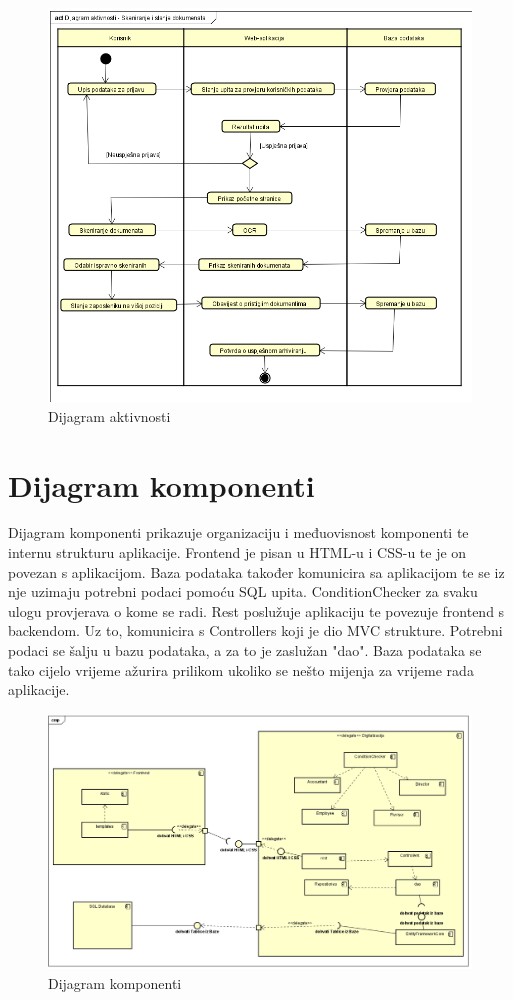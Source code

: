 			 \begin{figure}[H]
			 	\includegraphics[scale=0.5]{slike/Dijagram aktivnosti.png} %
			 	\centering
			 	\caption{Dijagram aktivnosti}
			 	\label{DA}
			 \end{figure}
			 
			
			\eject
		\section{Dijagram komponenti}
		
			 Dijagram komponenti prikazuje organizaciju i međuovisnost komponenti te internu strukturu aplikacije. Frontend je pisan u HTML-u i CSS-u te je on povezan s aplikacijom. Baza podataka također komunicira sa aplikacijom te se iz nje uzimaju potrebni podaci pomoću SQL upita. ConditionChecker za svaku ulogu provjerava o kome se radi. Rest poslužuje aplikaciju te povezuje frontend s backendom. Uz to, komunicira s Controllers koji je dio MVC strukture. Potrebni podaci se šalju u bazu podataka, a za to je zaslužan "dao". Baza podataka se tako cijelo vrijeme ažurira prilikom ukoliko se nešto mijenja za vrijeme rada aplikacije.
			 
			 
			  \begin{figure}[H]
			 	\includegraphics[scale=0.5]{slike/Dijagram komponenti.png} %
			 	\centering
			 	\caption{Dijagram komponenti}
			 	\label{DK}
			 \end{figure}
			 